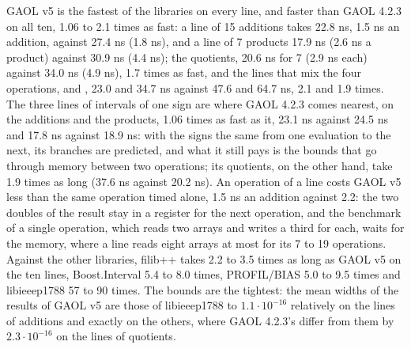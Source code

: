 \documentclass[12pt,a4paper,twoside,openright]{book}
\begin{document}
GAOL v5 is the fastest of the libraries on every line, and faster than GAOL
4.2.3 on all ten, 1.06 to 2.1 times as fast: a line of 15 additions takes
22.8 ns, 1.5 ns an addition, against 27.4 ns (1.8 ns), and a line of 7
products 17.9 ns (2.6 ns a product) against 30.9 ns (4.4 ns); the quotients,
20.6 ns for 7 (2.9 ns each) against 34.0 ns (4.9 ns), 1.7 times as fast, and
the lines that mix the four operations,  and ,
23.0 and 34.7 ns against 47.6 and 64.7 ns, 2.1 and 1.9 times. The three
lines of intervals of one sign are where GAOL 4.2.3 comes nearest, on the
additions and the products, 1.06 times as fast as it, 23.1 ns against
24.5 ns and 17.8 ns against 18.9 ns: with the signs the same from one
evaluation to the next, its branches are predicted, and what it still pays
is the bounds that go through memory between two operations; its quotients,
on the other hand, take 1.9 times as long (37.6 ns against 20.2 ns). An
operation of a line costs GAOL v5 less than the same operation timed alone,
1.5 ns an addition against 2.2: the two doubles of the result stay in a
register for the next operation, and the benchmark of a single operation,
which reads two arrays and writes a third for each, waits for the memory,
where a line reads eight arrays at most for its 7 to 19 operations. Against
the other libraries, filib++ takes 2.2 to 3.5 times as long as GAOL v5 on
the ten lines, Boost.Interval 5.4 to 8.0 times, PROFIL/BIAS 5.0 to 9.5 times
and libieeep1788 57 to 90 times. The bounds are the tightest: the mean
widths of the results of GAOL v5 are those of libieeep1788 to
$1.1\cdot10^{-16}$ relatively on the lines of additions and exactly on the
others, where GAOL 4.2.3's differ from them by $2.3\cdot10^{-16}$ on the
lines of quotients.
\end{document}
